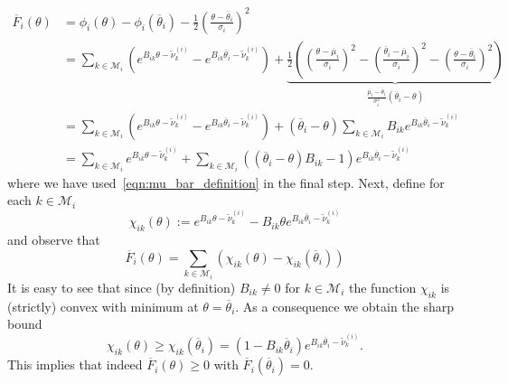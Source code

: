 \documentclass[11pt]{article}
\begin{document}
\begin{equation}
    \begin{aligned}
\overline{F}_i(\theta) &= \phi_i(\theta)-\phi_i(\overline{\theta}_i)-\frac{1}{2}\left(\frac{\theta-\overline{\theta}_i}{\sigma_i}\right)^2\\
&= \sum_{k\in\mathcal{M}_i}\left(e^{B_{ik}\theta-\widetilde{\nu}_k^{(i)}}-e^{B_{ik}\overline{\theta}_i-\widetilde{\nu}_k^{(i)}}\right)
+ \underbrace{\frac{1}{2}\left(\left(\frac{\theta-\overline{\mu}_i}{\sigma_i}\right)^2-\left(\frac{\overline{\theta}_i-\overline{\mu}_i}{\sigma_i}\right)^2-\left(\frac{\theta-\overline{\theta}_i}{\sigma_i}\right)^2\right)}_{\frac{\overline{\mu}_i-\overline{\theta}_i}{\sigma_i^2}(\overline{\theta}_i-\theta)}\\
&= \sum_{k\in\mathcal{M}_i}\left(e^{B_{ik}\theta-\widetilde{\nu}_k^{(i)}}-e^{B_{ik}\overline{\theta}_i-\widetilde{\nu}_k^{(i)}}\right)
+ (\overline{\theta}_i-\theta) \sum_{k\in\mathcal{M}_i} B_{ik} e^{B_{ik}\overline{\theta}_i-\widetilde{\nu}_k^{(i)}}\\
&= \sum_{k\in\mathcal{M}_i}e^{B_{ik}\theta-\widetilde{\nu}_k^{(i)}}
+ \sum_{k\in\mathcal{M}_i} \left((\overline{\theta}_i-\theta)B_{ik} -1\right) e^{B_{ik}\overline{\theta}_i-\widetilde{\nu}_k^{(i)}}
    \end{aligned}
\end{equation}
where we have used~\eqref{eqn:mu_bar_definition} in the final step. Next, define for each $k\in\mathcal{M}_i$ 
\begin{equation}
\chi_{ik}(\theta) := e^{B_{ik}\theta-\widetilde{\nu}_k^{(i)}} - B_{ik}\theta e^{B_{ik}\overline{\theta}_i-\widetilde{\nu}_k^{(i)}}
\end{equation}
and observe that
\begin{equation}
\overline{F}_i(\theta) = \sum_{k\in\mathcal{M}_i} \left(\chi_{ik}(\theta)-\chi_{ik}(\overline{\theta}_i)\right)
\end{equation}
It is easy to see that since (by definition) $B_{ik}\neq 0$ for $k\in\mathcal{M}_i$ the function $\chi_{ik}$ is (strictly) convex with minimum at $\theta=\overline{\theta}_i$. As a consequence we obtain the sharp bound
\begin{equation}
\chi_{ik}(\theta) \ge \chi_{ik}(\overline{\theta}_i) = (1-B_{ik}\overline{\theta}_i) e^{B_{ik}\overline{\theta}_i-\widetilde{\nu}_k^{(i)}}.
\end{equation}
This implies that indeed $\overline{F}_i(\theta)\ge 0$ with $\overline{F}_i(\overline{\theta}_i)=0$.
\end{document}
